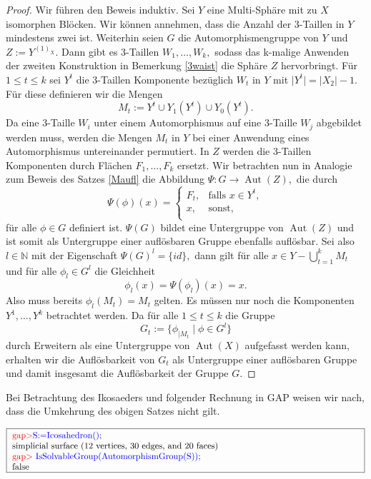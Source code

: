 \documentclass[12pt,titlepage,twoside,cleardoublepage]{article}
\theoremstyle{nummermitklammern}
\numberwithin{equation}{section}
\DeclareMathOperator{\Aut}{Aut}
\begin{document}
\begin{proof}
Wir führen den Beweis induktiv. Sei $Y$ eine Multi-Sphäre mit zu $X$ isomorphen Blöcken. Wir können annehmen, dass die Anzahl der 3-Taillen in $Y$ mindestens zwei ist. Weiterhin seien $G$ die Automorphismengruppe von $Y$ und $Z:=Y^{(1)_X}.$ Dann gibt es 3-Taillen $W_1,\ldots,W_k,$ sodass das k-malige Anwenden der zweiten Konstruktion in Bemerkung \ref{3waist} die Sphäre $Z$ hervorbringt.
 Für $1\leq t \leq k$ sei $Y^t$ die 3-Taillen Komponente bezüglich $W_t$ in $Y$ mit $\vert Y^t\vert =\vert X_2\vert -1.$ Für diese definieren wir die Mengen 
\[
M_t:=Y^t\cup Y_1(Y^t)\cup Y_0(Y^t).
\] Da eine 3-Taille $W_i$ unter einem Automorphismus auf eine  3-Taille $W_j$ abgebildet werden muss, werden die Mengen $M_t$ in $Y$ bei einer Anwendung eines Automorphismus untereinander permutiert. In $Z$ werden die 3-Taillen Komponenten durch Flächen $F_1,\ldots,F_k$ ersetzt.
Wir betrachten nun in Analogie zum Beweis des Satzes \ref{Maufl} die Abbildung $\Psi:G\to \Aut(Z),$ die durch
\[
\Psi(\phi)(x)=
\begin{cases}
F_t,&\text{falls }  x\in Y^t ,\\
x,& \text{sonst},\\
\end{cases}
\]
für alle $\phi\in G$ definiert ist.
$\Psi(G)$ bildet eine Untergruppe von $\Aut(Z)$ und ist somit als Untergruppe einer auflösbaren Gruppe ebenfalls auflösbar. Sei also $l\in \mathbb{N}$ mit der Eigenschaft $\Psi(G)^l=\{id\},$ dann gilt für alle $x\in Y-\bigcup_{t=1}^kM_t$ und für alle $\phi_l \in G^l$ die Gleichheit
\[
\phi_l(x)=\Psi(\phi_l)(x)=x.
\]
Also muss bereits $\phi_l(M_t)=M_t$ gelten. Es müssen nur noch die Komponenten $Y^1,\ldots,Y^k$ betrachtet werden. Da für alle $1\leq t\leq k$ die Gruppe 
\[
G_t:=\{\phi_{\mid M_t}\mid \phi\in G^l\}
\]
durch Erweitern als eine Untergruppe von $\Aut(X)$ aufgefasst werden kann, erhalten wir die Auflösbarkeit von $G_t$ als Untergruppe einer auflösbaren Gruppe und damit insgesamt die Auflösbarkeit der Gruppe $G.$
 \end{proof}
Bei Betrachtung des Ikosaeders und folgender Rechnung in GAP weisen wir nach, dass die Umkehrung des obigen Satzes nicht gilt.
\begin{center}
$\fbox{
\parbox{14cm}{
\textcolor{red}{gap$>$}\textcolor{blue}{ S:=Icosahedron();}\newline
simplicial surface (12 vertices, 30 edges, and 20 faces)\newline
\textcolor{red}{gap$>$} \textcolor{blue}{IsSolvableGroup(AutomorphismGroup(S));}\newline
false
}}$
\end{center}
\end{document}
